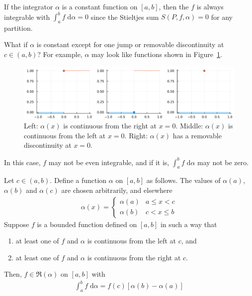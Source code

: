 \documentclass[thmcnt=section, 12pt]{my-elegantbook}
\begin{document}
\par If the integrator $\alpha$ is a constant function on $[a, b]$, then the $f$ is always integrable with $\int_{a}^{b} f\; \mathrm{d}\alpha = 0$ since the Stieltjes sum $S(P,f,\alpha) = 0$ for any partition. 

\par What if $\alpha$ is constant except for one jump or removable discontinuity at $c \in (a, b)$? For example, $\alpha$ may look like functions shown in Figure~\ref{fig:9}.

\begin{figure}[ht]
    \centering
    \includegraphics[scale=0.2]{figures/step-func-integrator.png}
    \caption{Left: $\alpha(x)$ is continuous from the right at $x=0$. Middle: $\alpha(x)$ is continuous from the left at $x=0$. Right: $\alpha(x)$ has a removable discontinuity at $x=0$.}
    \label{fig:9}
\end{figure}

\noindent In this case, $f$ may not be even integrable, and if it is, $\int_{a}^{b} f \; \mathrm{d}\alpha$ may not be zero.

\begin{theorem} \label{thm:24}
    Let $c \in (a, b)$. Define a function $\alpha$ on $[a, b]$ as follows. The values of $\alpha(a)$, $\alpha(b)$ and $\alpha(c)$ are chosen arbitrarily, and elsewhere
    \begin{align*}
        \alpha(x) = \begin{cases}
            \alpha(a) & a \leq x < c \\
            \alpha(b) & c < x \leq b
        \end{cases}
    \end{align*}
    Suppose $f$ is a bounded function defined on $[a, b]$ in such a way that
    \begin{enumerate}
        \item at least one of $f$ and $\alpha$ is continuous from the left at $c$, and
        \item at least one of $f$ and $\alpha$ is continuous from the right at $c$.
    \end{enumerate}
    Then, $f \in \mathfrak{R}(\alpha)$ on $[a, b]$ with 
    \begin{align}
        \int_{a}^{b} f \; \mathrm{d}\alpha
        = f(c) [\alpha(b) - \alpha(a)]
        \label{eq:40}
    \end{align}
\end{theorem}
\end{document}
